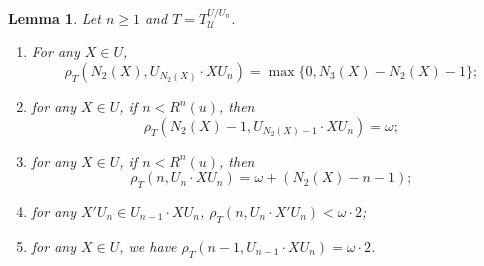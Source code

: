 \documentclass[11pt]{amsart}
\newtheorem{lemma}[theorem]{Lemma}
\theoremstyle{definition}
\theoremstyle{remark}
\numberwithin{equation}{section}
\def\otr#1#2{T_{\mathcal{#1}}^{#2}}
\begin{document}
\begin{lemma}\label{U的轨道树节点的秩}
    Let $n\geq 1$ and $T=\otr{U}{U/U_n}$.
    \begin{enumerate}
        \item[(1)] For any $X\in U$, $$\rho_T(N_2(X),U_{N_2(X)}\cdot XU_n)=\max\{0,N_3(X)-N_2(X)-1\};$$
        \item[(2)] for any $X\in U$, if $n<R^n(u)$, then $$\rho_T(N_2(X)-1,U_{N_2(X)-1}\cdot XU_n)=\omega;$$
        \item[(3)] for any $X\in U$, if $n<R^n(u)$, then
        $$\rho_T(n,U_n\cdot XU_n)=\omega+(N_2(X)-n-1);$$
        \item[(4)] for any $X'U_n\in U_{n-1}\cdot XU_n$, $\rho_T(n,U_n\cdot X'U_n)<\omega\cdot 2$;
        \item[(5)] for any $X\in U$, we have $\rho_T(n-1,U_{n-1}\cdot XU_n)=\omega\cdot 2$.
    \end{enumerate}
\end{lemma}
\end{document}
